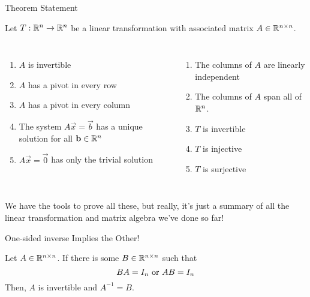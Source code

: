 \documentclass[xcoler=dvipsnames, aspectratio=169]{beamer}
\date{Invertible Matrix Theorem}
\begin{document}
    \begin{frame}{Theorem Statement}
        \begin{theorem}
            Let $T:\mathbb{R}^n\rightarrow\mathbb{R}^n$ be a linear transformation with associated matrix 
            $A\in\mathbb{R}^{n\times n}$.
            \begin{columns}
                \begin{enumerate}
                    \item $A$ is invertible
                    \pause
                    \item $A$ has a pivot in every row
                    \item $A$ has a pivot in every column
                    \pause
                    \item The system $A\vec{x}=\vec{b}$ has a unique solution for all 
                        $\mathbf{b}\in\mathbb{R}^n$
                    \pause
                    \item $A\vec{x}=\vec{0}$ has only the trivial solution
                    \pause
                \end{enumerate}
                \begin{enumerate} \addtocounter{enumi}{5}
                    \item The columns of $A$ are linearly independent
                    \pause
                    \item The columns of $A$ span all of $\mathbb{R}^n$.
                    \pause
                    \item $T$ is invertible
                    \pause
                    \item $T$ is injective
                    \pause
                    \item $T$ is surjective
                \end{enumerate}
            \end{columns}
        \end{theorem}
        \pause
        We have the tools to prove all these, but really, it's just a summary of all the 
        linear transformation and matrix algebra we've done so far!
    \end{frame}

    \begin{frame}{One-sided inverse Implies the Other!}
        \begin{theorem}
            Let $A\in\mathbb{R}^{n\times n}$. If there is some $B\in\mathbb{R}^{n\times n}$ such that 
            \[
                BA = I_n\textnormal{ or }AB = I_n
            \]
            Then, $A$ is invertible and $A^{-1}=B$.
        \end{theorem}
    \end{frame}
\end{document}
